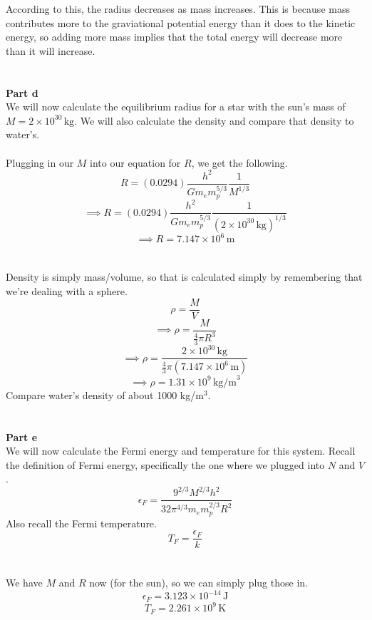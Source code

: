 \documentclass[12pt]{article}
\begin{document}
\begin{flushleft}
According to this, the radius decreases as mass increases.
This is because mass contributes more to the graviational potential energy than it does to the kinetic energy, so adding more mass implies that the total energy will decrease more than it will increase.\\~\\~\\



\textbf{Part d}\\
We will now calculate the equilibrium radius for a star with the sun's mass of $M=2\times10^{30}\,\text{kg}$.
We will also calculate the density and compare that density to water's.\\~\\

Plugging in our $M$ into our equation for $R$, we get the following.
$$R=(0.0294)\frac{h^2}{Gm_em_p^{5/3}}\frac{1}{M^{1/3}}$$
$$\implies R=(0.0294)\frac{h^2}{Gm_em_p^{5/3}}\frac{1}{(2\times10^{30}\,\text{kg})^{1/3}}$$
$$\implies R=7.147\times10^{6}\,\text{m}$$\\~\\

Density is simply mass/volume, so that is calculated simply by remembering that we're dealing with a sphere.
$$\rho=\frac{M}{V}$$
$$\implies\rho=\frac{M}{\frac{4}{3}\pi R^3}$$
$$\implies\rho=\frac{2\times10^{30}\,\text{kg}}{\frac{4}{3}\pi(7.147\times10^{6}\,\text{m})}$$
$$\implies\rho=1.31\times10^9\,\text{kg/m}^3$$
Compare water's density of about 1000 kg/m$^3$.\\~\\~\\



\textbf{Part e}\\
We will now calculate the Fermi energy and temperature for this system.
Recall the definition of Fermi energy, specifically the one where we plugged into $N$ and $V$.
\begin{equation}
    \epsilon_F=\frac{9^{2/3}M^{2/3}h^2}{32\pi^{4/3}m_em_p^{2/3}R^2}
\end{equation}
Also recall the Fermi temperature.
\begin{equation}
    T_F=\frac{\epsilon_F}{k}
\end{equation}\\~\\

We have $M$ and $R$ now (for the sun), so we can simply plug those in.
$$\epsilon_F=3.123\times10^{-14}\,\text{J}$$
$$T_F=2.261\times10^9\,\text{K}$$\\~\\


\end{flushleft}
\end{document}
